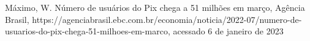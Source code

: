\documentclass[
12pt,		%
openright,	%
twoside,  %
a4paper,			%
chapter=TITLE,		%
english,			%
french,				%
spanish,			%
brazil				%
]{USPSC-classe/USPSC}
\begin{document}
\begin{flushleft}
\begin{flushleft}
\begin{flushleft}
\begin{flushleft}
\begin{flushleft}
\begin{flushleft}
\begin{flushleft}
\begin{flushleft}
\begin{flushleft}
\begin{flushleft}
[M\'aximo, 2022] M\'aximo, W. N\'umero de usu\'arios do Pix chega a 51 milh\~oes em mar\c{c}o, Ag\^encia Brasil, https://agenciabrasil.ebc.com.br/economia/noticia/2022-07/numero-de-usuarios-do-pix-chega-51-milhoes-em-marco, acessado 6 de janeiro de 2023
\end{flushleft}


\end{flushleft}


\end{flushleft}


\end{flushleft}


\end{flushleft}


\end{flushleft}


\end{flushleft}


\end{flushleft}


\end{flushleft}


\end{flushleft}
\end{document}
